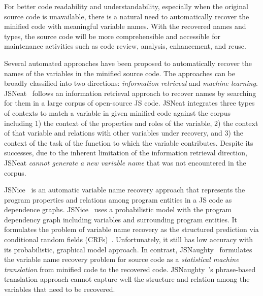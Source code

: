 For better code readability and understandability, especially when the
original source code is unavailable, there is a natural need to
automatically recover the minified code with meaningful variable
names. With the recovered names and types, the source code will be
more comprehensible and accessible for maintenance activities such
as code review, analysis, enhancement, and reuse.




Several automated approaches have been proposed to automatically
recover the names of the variables in the minified source code.  The
approaches can be broadly classified into two directions: {\em
information retrieval} and {\em machine learning}.
JSNeat~\cite{icse19} follows an information retrieval approach to
recover names by searching for them in a large corpus of open-source
JS code. JSNeat integrates three types of contexts to match a variable
in given minified code against the corpus including 1) the context of
the properties and roles of the variable, 2) the context of that
variable and relations with other variables under recovery, and 3) the
context of the task of the function to which the variable contributes.
Despite its successes, due to the inherent limitation of the
information retrieval direction, JSNeat {\em cannot generate a new
variable name} that was not encountered in the corpus.

JSNice~\cite{JSNice2015} is an automatic variable name recovery
approach that represents the program properties and relations among
program entities in a JS code as dependence
graphs. JSNice~\cite{JSNice2015} uses a probabilistic model with the
program dependency graph including variables and surrounding program
entities. It formulates the problem of variable name recovery as the
structured prediction via conditional random fields
(CRFs)~\cite{JSNice2015}. Unfortunately, it still has low accuracy
with its probabilistic, graphical model approach.
%
In contrast, JSNaughty~\cite{JSNaughty2017} formulates the variable
name recovery problem for source code as a {\em statistical machine
translation} from minified code to the recovered
code. JSNaughty~\cite{JSNaughty2017}'s phrase-based translation
approach cannot capture well the structure and relation among the
variables that need to be recovered.


%



